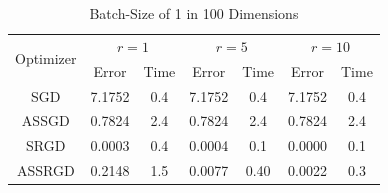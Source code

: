 \documentclass[,conference,compsoc]{IEEEtran}
\begin{document}
\begin{table}[!t]
\renewcommand{\arraystretch}{1.3}
\caption{Batch-Size of 1 in 100 Dimensions}
\label{tab:d100mb1}
\centering
\begin{tabular}{|c||c|c|c|c|c|c|}
\hline
\multirow{2}{*}{Optimizer} &
    \multicolumn{2}{c}{$r = 1$} &
    \multicolumn{2}{c}{$r = 5$} &
    \multicolumn{2}{c|}{$r = 10$}\\
    & Error & Time & Error & Time & Error & Time \\
    \hline
    SGD & 7.1752 & 0.4 & 7.1752 & 0.4 & 7.1752 & 0.4\\ 
    \hline
    ASSGD & 0.7824 & 2.4 & 0.7824 & 2.4& 0.7824 & 2.4\\
    \hline
    SRGD & 0.0003 & 0.4 & 0.0004 & 0.1 & 0.0000 & 0.1\\
    \hline
    ASSRGD & 0.2148 & 1.5 & 0.0077 & 0.40 & 0.0022 & 0.3\\
\hline
\end{tabular}
\end{table}
\end{document}
